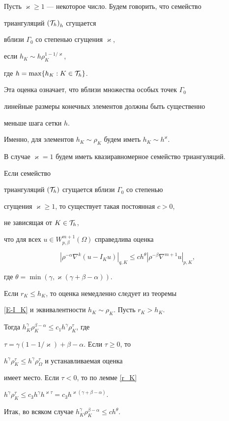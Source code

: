 Пусть $\varkappa \ge 1$ --- некоторое число. Будем говорить, что семейство 


триангуляций ${({\cal T}_h)}_h$ сгущается


вблизи $\Gamma_0$ со степенью сгущения $\varkappa$,


если $h_K \sim h\rho_K^{1-1/\varkappa}$,


где $h=\max\{h_K:K \in {\cal T}_h\}$. 


Эта оценка означает, что вблизи множества особых точек $\Gamma_0$ 


линейные размеры конечных элементов должны быть существенно


меньше шага сетки $h$. 


Именно, для элементов $h_K \sim \rho_K$ будем иметь $h_K \sim h^\varkappa$. 


В случае $\varkappa=1$ будем иметь квазиравномерное семейство триангуляций. 





\begin{thm}\label{loc:dense} Если семейство 


триангуляций $({\cal T}_h)$ сгущается вблизи $\Gamma_0$ со степенью 


сгущения $\varkappa \ge 1$, то существует такая постоянная $c > 0$,


не зависящая от $K \in {\cal T}_h$, 


что для всех $u \in W^{m+1}_{p,\beta}(\Omega)$ справедлива оценка 


$$


{|\rho^{-\alpha} \nabla ^k (u-I_Ku)|}_{q,K} \le c h^\theta 


{|\rho^{-\beta}\nabla^{m+1}u|}_{p,K}, 


$$ 


где $\theta = \min(\gamma,\varkappa(\gamma+\beta-\alpha)).$ 


\end{thm}





\begin{pf}


Если $r_K \le h_K$, то оценка немедленно следует из теоремы 


\ref{E-I_K} и эквивалентности $h_K \sim \rho_K$. Пусть $r_K > h_K$. 


Тогда $ h_K^\gamma \rho_K^{\beta-\alpha} \le c_1h^\gamma\rho_K^\tau$, где 


$\tau=\gamma(1-1/\varkappa)+\beta-\alpha$. Если $\tau \ge 0$, то 


$h^\gamma\rho_K^\tau \le h^\gamma\rho_\Omega^\tau$ и устанавливаемая оценка 


имеет место. Если $\tau < 0$, то по лемме \ref{r_K}\;


$h^\gamma\rho_K^\tau \le c_3 h^\gamma h^{\varkappa\tau}=


c_3h^{\varkappa(\gamma+\beta-\alpha)}.$ 


Итак, во всяком случае $h_K^\gamma \rho_K^{\beta-\alpha} \le c h^\theta$. 


\end{pf}





